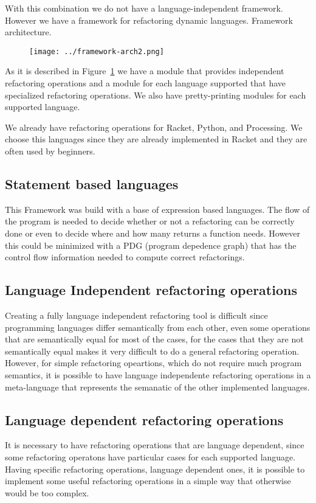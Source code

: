 With this combination we do not have a language-independent framework. However we have a framework
for refactoring dynamic languages.
Framework architecture.%
\begin{figure}[h]
\texttt{[image: ../framework-arch2.png]}
\label{fig:framework}
\end{figure}

As it is described in Figure~\ref{fig:framework} we have a module that provides
independent refactoring operations and a module for each language supported that
have specialized refactoring operations. We also have pretty-printing modules for
each supported language.

We already have refactoring operations for Racket, Python, and Processing. We choose
this languages since they are already implemented in Racket and they are often used by beginners.


\subsection{Statement based languages}
This Framework was build with a base of expression based languages. The flow of
the program is needed to decide whether or not a refactoring can be correctly done
or even to decide where and how many returns a function needs. However this could
be minimized with a PDG (program depedence graph) that has the control flow information
needed to compute correct refactorings.

\subsection{Language Independent refactoring operations}
Creating a fully language independent refactoring tool is difficult since programming
languages differ semantically from each other, even some operations that are semantically
equal for most of the cases, for the cases that they are not semantically equal makes it very
difficult to do a general refactoring operation.
However, for simple refactoring opeartions, which do not require much program semantics,
it is possible to have language independente refactoring operations in a meta-language that
represents the semanatic of the other implemented languages. %

\subsection{Language dependent refactoring operations}
It is necessary to have refactoring operations that are language dependent, since
some refactoring operatons have particular cases for each supported language.
Having specific refactoring operations, language dependent ones, it is possible
to implement some useful refactoring operations in a simple way that otherwise would
be too complex.

